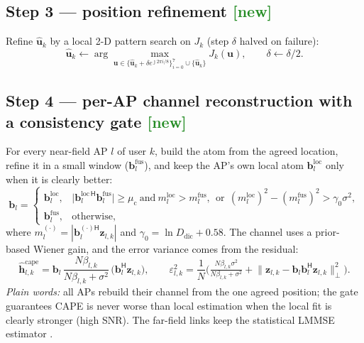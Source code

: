 \documentclass[11pt]{article}
\newcommand{\herm}{^{\mathsf{H}}}
\newcommand{\vh}{\mathbf{h}}
\newcommand{\vz}{\mathbf{z}}
\newcommand{\vb}{\mathbf{b}}
\begin{document}
\subsection{Step 3 --- position refinement \textcolor{ForestGreen}{[new]}}
Refine $\hat{\mathbf u}_k$ by a local 2-D pattern search on $J_k$ (step $\delta$ halved on failure):
\begin{equation}
\hat{\mathbf u}_k\leftarrow\arg\max_{\mathbf u\in\{\hat{\mathbf u}_k+\delta e^{\jmath 2\pi i/8}\}_{i=0}^{7}\cup\{\hat{\mathbf u}_k\}} J_k(\mathbf u),
\qquad \delta\leftarrow\delta/2 .
\label{eq:refine}
\end{equation}

\subsection{Step 4 --- per-AP channel reconstruction with a consistency gate \textcolor{ForestGreen}{[new]}}
For every near-field AP $l$ of user $k$, build the atom from the agreed location, refine it in a
small window ($\vb_l^{\mathrm{fus}}$), and keep the AP's own local atom $\vb_l^{\mathrm{loc}}$ only
when it is clearly better:
\begin{equation}
\vb_l=
\begin{cases}
\vb_l^{\mathrm{loc}}, & \big|\vb_l^{\mathrm{loc}\,\mathsf H}\vb_l^{\mathrm{fus}}\big|\ge\mu_{\mathrm{c}}
  \ \text{and}\ m_l^{\mathrm{loc}}>m_l^{\mathrm{fus}},\ \ \text{or}\ \
  (m_l^{\mathrm{loc}})^2-(m_l^{\mathrm{fus}})^2>\gamma_0\sigma^2,\\[2pt]
\vb_l^{\mathrm{fus}}, & \text{otherwise,}
\end{cases}
\label{eq:gate}
\end{equation}
where $m_l^{(\cdot)}=|\vb_l^{(\cdot)\mathsf H}\vz_{l,k}|$ and $\gamma_0=\ln D_{\mathrm{dic}}+0.58$.
The channel uses a prior-based Wiener gain, and the error variance comes from the residual:
\begin{equation}
\hat{\vh}^{\mathrm{cape}}_{l,k}=\vb_l\,\frac{N\beta_{l,k}}{N\beta_{l,k}+\sigma^2}\,\big(\vb_l\herm\vz_{l,k}\big),
\qquad
\varepsilon_{l,k}^2=\frac{1}{N}\Big(\tfrac{N\beta_{l,k}\sigma^2}{N\beta_{l,k}+\sigma^2}
+\big\|\vz_{l,k}-\vb_l\vb_l\herm\vz_{l,k}\big\|^2_{\perp}\Big).
\label{eq:cape-h}
\end{equation}
\emph{Plain words:} all APs rebuild their channel from the one agreed position; the gate guarantees
CAPE is never worse than local estimation when the local fit is clearly stronger (high SNR). The
far-field links keep the statistical LMMSE estimator \cite{bjornson2021primer}.
\end{document}
